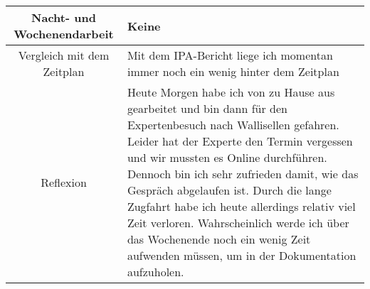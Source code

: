 \begin{tabularx}{\textwidth}[H]{|c|X|}
    Nacht- und Wochenendarbeit &
    Keine
    \\ \hline

    Vergleich mit dem Zeitplan &
    Mit dem IPA-Bericht liege ich momentan immer noch ein wenig hinter dem Zeitplan
    \\ \hline

    Reflexion                  &
    Heute Morgen habe ich von zu Hause aus gearbeitet und bin dann für den Expertenbesuch nach Wallisellen gefahren. Leider hat der Experte
    den Termin vergessen und wir mussten es Online durchführen. Dennoch bin ich sehr zufrieden damit, wie das Gespräch abgelaufen ist.
    Durch die lange Zugfahrt habe ich heute allerdings relativ viel Zeit verloren. Wahrscheinlich
    werde ich über das Wochenende noch ein wenig Zeit aufwenden müssen, um in der Dokumentation aufzuholen.
    \\ \hline
\end{tabularx}
